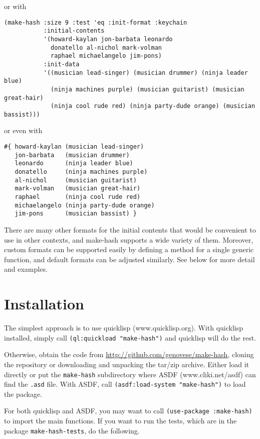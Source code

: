 \documentclass[11pt]{article}
\begin{document}
  or with
  

\begin{verbatim}
(make-hash :size 9 :test 'eq :init-format :keychain
           :initial-contents
           '(howard-kaylan jon-barbata leonardo
             donatello al-nichol mark-volman
             raphael michaelangelo jim-pons)
           :init-data
           '((musician lead-singer) (musician drummer) (ninja leader blue)
             (ninja machines purple) (musician guitarist) (musician great-hair)
             (ninja cool rude red) (ninja party-dude orange) (musician bassist)))
\end{verbatim}




  or even with


\begin{verbatim}
#{ howard-kaylan (musician lead-singer)
   jon-barbata   (musician drummer)
   leonardo      (ninja leader blue)
   donatello     (ninja machines purple)
   al-nichol     (musician guitarist)
   mark-volman   (musician great-hair)
   raphael       (ninja cool rude red)
   michaelangelo (ninja party-dude orange)
   jim-pons      (musician bassist) }
\end{verbatim}




  There are many other formats for the initial contents that would be
  convenient to use in other contexts, and make-hash supports a wide
  variety of them. Moreover, custom formats can be supported easily by
  defining a method for a single generic function, and default formats
  can be adjusted similarly. See below for more detail and examples.
\section{Installation}
\label{sec-2}


  The simplest approach is to use quicklisp (www.quicklisp.org).
  With quicklisp installed, simply call \texttt{(ql:quickload "make-hash")}
  and quicklisp will do the rest.
  
  Otherwise, obtain the code from \href{http://github.com/genovese/make-hash}{http://github.com/genovese/make-hash},
  cloning the repository or downloading and unpacking the tar/zip archive.
  Either load it directly or put the \texttt{make-hash} subdirectory
  where ASDF (www.cliki.net/asdf) can find the \texttt{.asd} file.
  With ASDF, call \texttt{(asdf:load-system "make-hash")} to load the
  package.

  For both quicklisp and ASDF, you may want to call
  \texttt{(use-package :make-hash)} to import the main functions. If you want to
  run the tests, which are in the package \texttt{make-hash-tests}, do the
  following.
\end{document}
